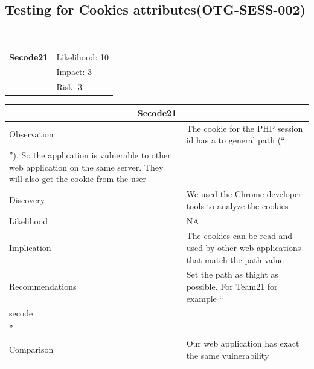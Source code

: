 \documentclass[headsepline,footsepline,footinclude=false,oneside,fontsize=11pt,paper=a4,listof=totoc,bibliography=totoc]{scrbook} %
\begin{document}
\pagebreak
\subsection{Testing for Cookies attributes(OTG-SESS-002)}\

\begin{tabular}{cR{12cm}}
	\textbf{Secode21} & Likelihood: 10\\& Impact: 3\\& Risk: 3
\end{tabular}

\begin{tabular}{ l|p{11cm}  }
	\hline
	\multicolumn{2}{c}{\textbf{Secode21}} \\
	\hline
	Observation   & The cookie for the PHP session id has a to general path (``\\''). So
	the application is vulnerable to other web application on the same server. They will
	also get the cookie from the user\\
	Discovery  & We used the Chrome developer tools to analyze the cookies\\
	Likelihood & NA\\
	Implication    & The cookies can be read and used by other web applications that
	match the path value \\
	Recommendations & Set the path as thight as possible. For Team21 for example ``\\secode\\'' \\
	Comparison& Our web application has exact the same vulnerability\\
	\hline
\end{tabular}
\\
\vspace{0.5cm}
\\
\end{document}

